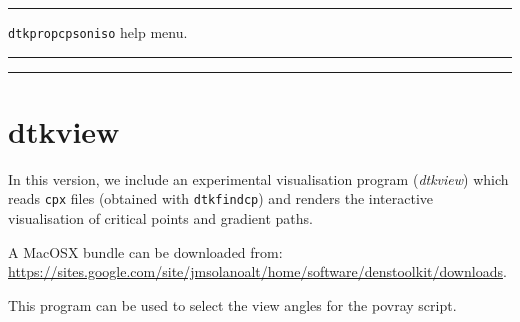 \newpage
\rule{\textwidth}{1pt}
{\center\texttt{dtkpropcpsoniso} help menu.\\}
\rule{\textwidth}{1pt}
\begin{footnotesize}
\end{footnotesize}
\rule{\textwidth}{1pt}

\section{\label{sec:dtkview}dtkview}

In this version, we include an experimental visualisation program (\textit{dtkview}) which
reads \texttt{cpx} files (obtained with \texttt{dtkfindcp}) and renders
the interactive visualisation of critical points and gradient paths.

A MacOSX bundle can be downloaded from:\\
\url{https://sites.google.com/site/jmsolanoalt/home/software/denstoolkit/downloads}.

This program can be used to select the view angles for the povray script.

